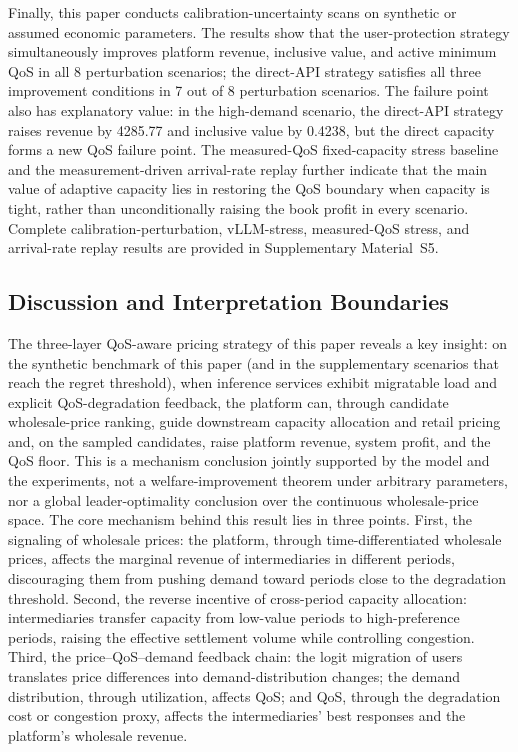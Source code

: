 \documentclass[11pt,a4paper]{article}
\begin{document}
Finally, this paper conducts calibration-uncertainty scans on synthetic or assumed economic parameters. The results show that the user-protection strategy simultaneously improves platform revenue, inclusive value, and active minimum QoS in all 8 perturbation scenarios; the direct-API strategy satisfies all three improvement conditions in 7 out of 8 perturbation scenarios. The failure point also has explanatory value: in the high-demand scenario, the direct-API strategy raises revenue by 4285.77 and inclusive value by 0.4238, but the direct capacity forms a new QoS failure point. The measured-QoS fixed-capacity stress baseline and the measurement-driven arrival-rate replay further indicate that the main value of adaptive capacity lies in restoring the QoS boundary when capacity is tight, rather than unconditionally raising the book profit in every scenario. Complete calibration-perturbation, vLLM-stress, measured-QoS stress, and arrival-rate replay results are provided in Supplementary Material~S5.

\subsection{Discussion and Interpretation Boundaries}
\label{sec:discussion}

The three-layer QoS-aware pricing strategy of this paper reveals a key insight: on the synthetic benchmark of this paper (and in the supplementary scenarios that reach the regret threshold), when inference services exhibit migratable load and explicit QoS-degradation feedback, the platform can, through candidate wholesale-price ranking, guide downstream capacity allocation and retail pricing and, on the sampled candidates, raise platform revenue, system profit, and the QoS floor. This is a mechanism conclusion jointly supported by the model and the experiments, not a welfare-improvement theorem under arbitrary parameters, nor a global leader-optimality conclusion over the continuous wholesale-price space. The core mechanism behind this result lies in three points. First, the signaling of wholesale prices: the platform, through time-differentiated wholesale prices, affects the marginal revenue of intermediaries in different periods, discouraging them from pushing demand toward periods close to the degradation threshold. Second, the reverse incentive of cross-period capacity allocation: intermediaries transfer capacity from low-value periods to high-preference periods, raising the effective settlement volume while controlling congestion. Third, the price--QoS--demand feedback chain: the logit migration of users translates price differences into demand-distribution changes; the demand distribution, through utilization, affects QoS; and QoS, through the degradation cost or congestion proxy, affects the intermediaries' best responses and the platform's wholesale revenue.
\end{document}
